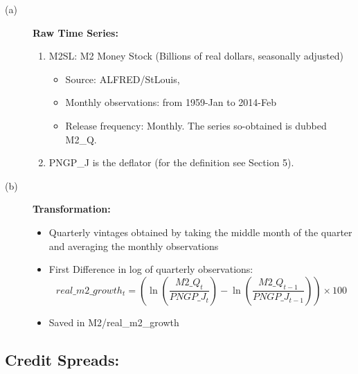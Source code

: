 \documentclass[3p,review,times]{elsarticle}		%
\begin{document}
\begin{description}
	\item[(a)] \textbf{Raw Time Series:}
	\begin{enumerate}
		\item M2SL: M2 Money Stock (Billions of real dollars, seasonally adjusted)
		
		\begin{itemize}
			\item Source: ALFRED/StLouis,
			\item Monthly observations: from 1959-Jan to 2014-Feb
			\item Release frequency: Monthly. 
			The series so-obtained is dubbed M2\_Q.
		\end{itemize}
		\item PNGP\_J is the deflator (for the definition see Section 5).
	\end{enumerate}
	\item[(b)] \textbf{Transformation:}
	\begin{itemize}			     
		\item Quarterly vintages obtained by taking the middle month of the quarter and averaging the monthly observations
		\item First Difference in log of quarterly observations:
		$$real\_m2\_growth_{t}=\left(\ln\left(\frac{M2\_Q_t}{PNGP\_J_t}\right)-\ln\left(\frac{M2\_Q_{t-1}}{PNGP\_J_{t-1}}\right)\right)\times 100$$
		\item Saved in 	M2/real\_m2\_growth
	\end{itemize}
\end{description}

\subsection{Credit Spreads: }
\end{document}
